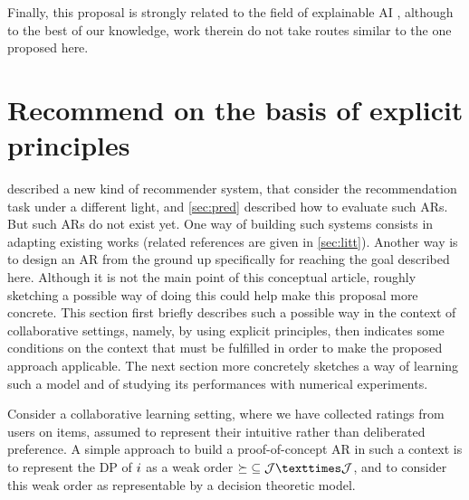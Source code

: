 \documentclass[version=3.21, pagesize, twoside=off, bibliography=totoc, DIV=calc, fontsize=12pt, a4paper, french, english]{scrartcl}
\begin{document}

Finally, this proposal is strongly related to the field of explainable AI \citep{DBLP:journals/corr/abs-1804-11192}, although to the best of our knowledge, work therein do not take routes similar to the one proposed here.

\section{Recommend on the basis of explicit principles}
\label{sec:princ}
 described a new kind of recommender system, that consider the recommendation task under a different light, and \cref{sec:pred} described how to evaluate such \acp{AR}. But such \acp{AR} do not exist yet. One way of building such systems consists in adapting existing works (related references are given in \cref{sec:litt}). Another way is to design an \ac{AR} from the ground up specifically for reaching the goal described here. Although it is not the main point of this conceptual article, roughly sketching a possible way of doing this could help make this proposal more concrete. This section first briefly describes such a possible way in the context of collaborative settings, namely, by using explicit principles, then indicates some conditions on the context that must be fulfilled in order to make the proposed approach applicable. The next section more concretely sketches a way of learning such a model and of studying its performances with numerical experiments.

Consider a collaborative learning setting, where we have collected ratings from users on items, assumed to represent their intuitive rather than deliberated preference. 
A simple approach to build a proof-of-concept \ac{AR} in such a context is to represent the \ac{DP} of $i$ as a weak order ${\succeq} \subseteq \allitems × \allitems$, and to consider this weak order as representable by a decision theoretic model.
\end{document}

